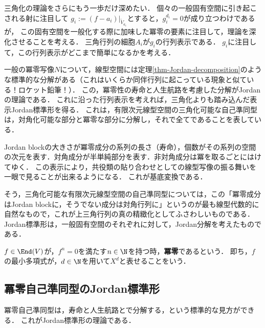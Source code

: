 \documentclass[uplatex, dvipdfmx]{jsreport}
\begin{document}
\begin{tcolorbox}[colframe=ForestGreen, colback=ForestGreen!10!white, breakable]
    三角化の理論をさらにもう一歩だけ深めたい．
    個々の一般固有空間に引き起こされる射に注目して
    $g_i:=(f-a_i)|_{\widetilde{V}_{a_i}}$とすると，$g_i^{d_i}=0$が成り立つわけであるが，
    この固有空間を一般化する際に加味した冪零の要素に注目して，理論を深化させることを考える．
    三角行列の細胞$A_i$が$g_i$の行列表示である．
    $g_i$に注目して，この行列表示がどこまで簡単になるかを考える．

    一般の冪零写像$N$について，線型空間には定理\ref{thm-Jordan-decomposition}のような標準的な分解がある（これはいくらか同伴行列に起こっている現象と似ている！ロケット鉛筆！）．
    この，冪零性の寿命と人生航路を考慮した分解がJordanの理論である．
    これに沿った行列表示を考えれば，三角化よりも踏み込んだ表示Jordan標準形を得る．
    これは，有限次元線型空間の三角化可能な自己準同型は，対角化可能な部分と冪零な部分に分解し，それで全てであることを表している．

    Jordan blockの大きさが冪零成分の系列の長さ（寿命），個数がその系列の空間の次元を表す．対角成分が半単純部分を表す．非対角成分は冪を取るごとにはけてゆく．
    この表示により，共役類の貼り合わせとしての線型写像の振る舞いを一眼で見ることが出来るようになる．
    これが基底変換である．

    そう，三角化可能な有限次元線型空間の自己準同型については，この「冪零成分はJordan blockに，そうでない成分は対角行列に」というのが最も線型代数的に自然なもので，これが上三角行列の真の精緻化としてふさわしいものである．
    Jordan標準形は，一般固有空間のそれぞれに対して，Jordan分解を考えたものである．
\end{tcolorbox}

\begin{definition}[nilpotent]
    $f\in\End(V)$が，$f^n=0$を満たす$n\in\N$を持つ時，\textbf{冪零}であるという．
    即ち，$f$の最小多項式が，$d\in\N$を用いて$X^d$と表せることをいう．
\end{definition}

\subsection{冪零自己準同型のJordan標準形}

\begin{tcolorbox}[colframe=ForestGreen, colback=ForestGreen!10!white, breakable]
    冪零自己準同型は，寿命と人生航路とで分解する，という標準的な見方ができる．
    これがJordan標準形の理論である．
\end{tcolorbox}
\end{document}
